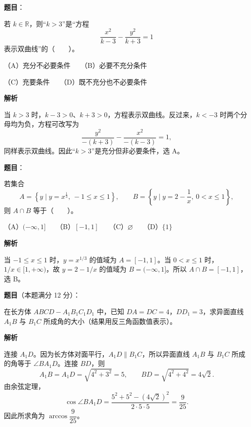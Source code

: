 \begin{answer}

\textbf{题目}：

若 $k\in\mathbb R$，则“$k>3$”是“方程
\nopagebreak[4]
\[
\frac{x^2}{k-3}-\frac{y^2}{k+3}=1
\]
表示双曲线”的\mbox{（　　）}。

（A）充分不必要条件　　（B）必要不充分条件

（C）充要条件　　（D）既不充分也不必要条件

\textbf{解析}

当 $k>3$ 时，$k-3>0$、$k+3>0$，方程表示双曲线。反过来，$k<-3$ 时两个分母均为负，方程可改写为
\nopagebreak[4]
\[
\frac{y^2}{-(k+3)}-\frac{x^2}{-(k-3)}=1,
\]
同样表示双曲线。因此“$k>3$”是充分但非必要条件，选 A。


\end{answer}
\begin{answer}

\textbf{题目}：

若集合
\nopagebreak[4]
\[
A=\left\{y\mid y=x^{\frac13},\ -1\leq x\leq1\right\},\qquad
B=\left\{y\mid y=2-\frac1x,\ 0<x\leq1\right\},
\]
则 $A\cap B$ 等于\mbox{（　　）}。

（A）$(-\infty,1]$　　（B）$[-1,1]$　　（C）$\varnothing$　　（D）$\{1\}$

\textbf{解析}

当 $-1\leq x\leq1$ 时，$y=x^{1/3}$ 的值域为 $A=[-1,1]$。当 $0<x\leq1$ 时，$1/x\in[1,+\infty)$，故 $y=2-1/x$ 的值域为 $B=(-\infty,1]$。所以 $A\cap B=[-1,1]$，选 B。


\end{answer}
\begin{answer}

\textbf{题目}（本题满分 12 分）：

在长方体 $ABCD-A_1B_1C_1D_1$ 中，已知 $DA=DC=4$，$DD_1=3$，求异面直线 $A_1B$ 与 $B_1C$ 所成角的大小（结果用反三角函数值表示）。
\nopagebreak[4]
\begin{center}\end{center}
\nopagebreak[4]
\textbf{解析}

连接 $A_1D$。因为长方体对面平行，$A_1D\parallel B_1C$，所以异面直线 $A_1B$ 与 $B_1C$ 所成的角等于 $\angle BA_1D$。连接 $BD$，则
\nopagebreak[4]
\[
A_1B=A_1D=\sqrt{4^2+3^2}=5,\qquad BD=\sqrt{4^2+4^2}=4\sqrt2.
\]
由余弦定理，
\nopagebreak[4]
\[
\cos\angle BA_1D=\frac{5^2+5^2-(4\sqrt2)^2}{2\cdot5\cdot5}=\frac9{25}.
\]
因此所求角为 $\arccos\dfrac9{25}$。


\end{answer}
